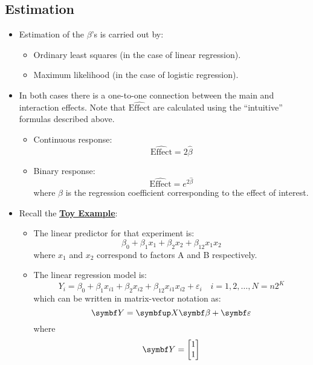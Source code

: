 \subsection*{Estimation}
\begin{itemize}
    \item Estimation of the $ \beta $'s is carried out by:
          \begin{itemize}[$\hookrightarrow$]
              \item Ordinary least squares (in the case of linear regression).
              \item Maximum likelihood (in the case of logistic regression).
          \end{itemize}
    \item In both cases there is a one-to-one connection between the
          main and interaction effects. Note that $ \widehat{\text{Effect}} $
          are calculated using the ``intuitive'' formulas described above.
          \begin{itemize}
              \item Continuous response:
                    \[ \widehat{\text{Effect}}=2\hat{\beta} \]
              \item Binary response:
                    \[ \widehat{\text{Effect}}=e^{2\hat{\beta}} \]
                    where $ \beta $ is the regression coefficient corresponding to the effect of interest.
          \end{itemize}
    \item Recall the \hyperref[ex:toy_ex]{\textbf{Toy Example}}:
          \begin{itemize}
              \item The linear predictor for that experiment is:
                    \[ \beta_0+\beta_1x_1+\beta_2x_2+\beta_{12}x_1x_2 \]
                    where $ x_1 $ and $ x_2 $ correspond to factors A and B respectively.
              \item The linear regression model is:
                    \[ Y_i=\beta_0+\beta_1x_{i1}+\beta_2x_{i2}+\beta_{12}x_{i1}x_{i2}+\varepsilon_i\quad i=1,2,\ldots,N=n2^K \]
                    which can be written in matrix-vector notation as:
                    \[ \RandomVector{Y}=\Matrix{X}\Vector{\beta}+\RandomVector{\varepsilon} \]
                    where
                    \[ \RandomVector{Y}=\begin{bmatrix}
                            1 \\
                            1 \\

\end{bmatrix}\]
\end{itemize}
\end{itemize}
